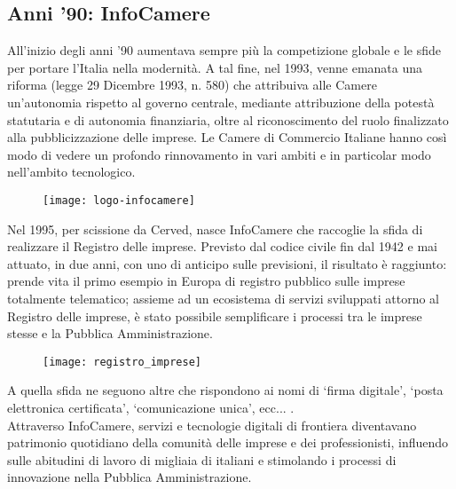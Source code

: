 	\subsection{Anni '90: InfoCamere}
	All'inizio degli anni '90 aumentava sempre più la competizione globale e le sfide per portare l'Italia nella modernità. A tal fine, nel 1993, venne emanata una riforma (legge 29 Dicembre 1993, n. 580) che attribuiva alle Camere un'autonomia rispetto al governo centrale, mediante attribuzione della potestà statutaria e di autonomia finanziaria, oltre al riconoscimento del ruolo finalizzato alla pubblicizzazione delle imprese. Le Camere di Commercio Italiane hanno così modo di vedere un profondo rinnovamento in vari ambiti e in particolar modo nell'ambito tecnologico.
	
	\begin{figure}[htbp]
		\begin{center}
			\texttt{[image: logo-infocamere]}
		\end{center}
	\end{figure}
	
	Nel 1995, per scissione da Cerved, nasce InfoCamere che raccoglie la sfida di realizzare il Registro delle imprese. Previsto dal codice civile fin dal 1942 e mai attuato, in due anni, con uno di anticipo sulle previsioni, il risultato è raggiunto: prende vita il primo esempio in Europa di registro pubblico sulle imprese  totalmente telematico; assieme ad un ecosistema di servizi sviluppati attorno al Registro delle imprese, è stato possibile semplificare i processi tra le imprese stesse e la Pubblica Amministrazione.
	
	\begin{figure}[htbp]
		\begin{center}
			\texttt{[image: registro\_imprese]}
		\end{center}
	\end{figure}
	
	A quella sfida ne seguono altre che rispondono ai nomi di ‘firma digitale’, ‘posta elettronica certificata’, ‘comunicazione unica’, ecc... . \\
	Attraverso InfoCamere, servizi e tecnologie digitali di frontiera diventavano patrimonio quotidiano della comunità delle imprese e dei professionisti, influendo sulle abitudini di lavoro di migliaia di italiani e stimolando i processi di innovazione nella Pubblica Amministrazione.

